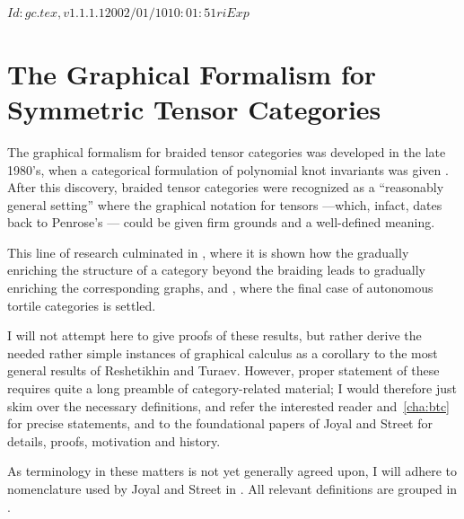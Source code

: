 \RCSID $Id: gc.tex,v 1.1.1.1 2002/01/10 10:01:51 ri Exp $


\chapter{The Graphical Formalism for Symmetric Tensor Categories}
\label{cha:gc}

The graphical formalism for braided tensor categories was developed in
the late 1980's, when a categorical formulation of polynomial knot
invariants was given \cite{freyd-yetter;btc, turaev;yang-baxter}.
After this discovery, braided tensor categories were recognized as a
``reasonably general setting'' \cite{joyal-street;tensor-calculus}
where the graphical notation for tensors ---which, infact, dates back
to Penrose's \cite{penrose;negative-dimensional-tensors}--- could be
given firm grounds and a well-defined meaning.

This line of research culminated in
\cite{joyal-street;tensor-calculus}, where it is shown how
the gradually enriching the structure of a category beyond the
braiding leads to gradually enriching the corresponding graphs, and
\cite{reshetikhin-turaev;ribbon-graphs}, where the final case of
autonomous tortile categories is settled.

I will not attempt here to give proofs of these results, but rather
derive the needed rather simple instances of graphical calculus as a
corollary to the most general results of Reshetikhin and Turaev.
However, proper statement of these requires quite a long preamble of
category-related material; I would therefore just skim over the
necessary definitions, and refer the interested reader 
and~\ref{cha:btc} for precise statements, and to the foundational
papers of Joyal and Street \cite{joyal-street;tensor-calculus,
  joyal-street;btc} for details, proofs, motivation and history.

As terminology in these matters is not yet generally agreed upon, I
will adhere to nomenclature used by Joyal and Street in
\cite{joyal-street;tensor-calculus, joyal-street;btc}. All relevant
definitions are grouped in .


